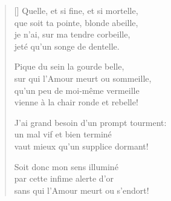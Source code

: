{\itshape
\begin{verse}[\versewidth]
  Quelle, et si fine, et si mortelle, \\
  que soit ta pointe, blonde abeille, \\
  je n'ai, sur ma tendre corbeille, \\
  jeté qu'un songe de dentelle.

  Pique du sein la gourde belle, \\
  sur qui l'Amour meurt ou sommeille, \\
  qu'un peu de moi-même vermeille \\
  vienne à la chair ronde et rebelle!

  J'ai grand besoin d'un prompt tourment: \\
  un mal vif et bien terminé \\
  vaut mieux qu'un supplice dormant!

  Soit donc mon sens illuminé \\
  par cette infime alerte d'or \\
  sans qui l'Amour meurt ou s'endort!
\end{verse}
}
